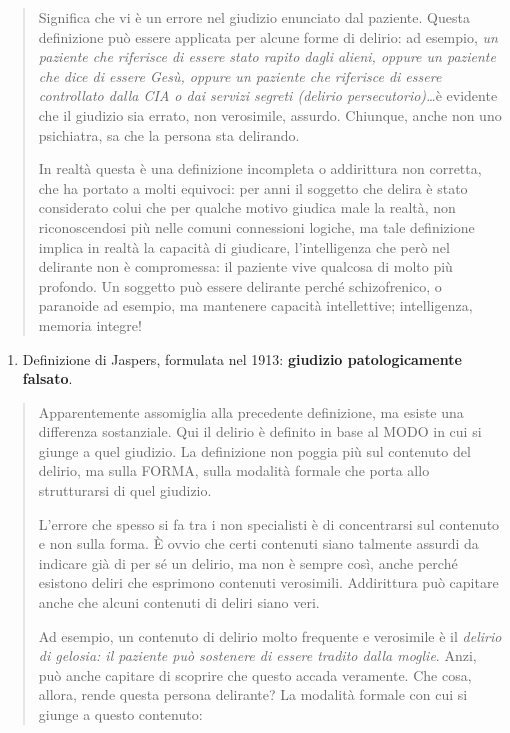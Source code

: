 \documentclass[]{article}
\begin{document}
\begin{quote}
Significa che vi è un errore nel giudizio enunciato dal paziente. Questa
definizione può essere applicata per alcune forme di delirio: ad
esempio, \emph{un paziente che riferisce di essere stato rapito dagli
alieni, oppure un paziente che dice di essere Gesù, oppure un paziente
che riferisce di essere controllato dalla CIA o dai servizi segreti
(delirio persecutorio)\ldots{}}è evidente che il giudizio sia errato,
non verosimile, assurdo. Chiunque, anche non uno psichiatra, sa che la
persona sta delirando.

In realtà questa è una definizione incompleta o addirittura non
corretta, che ha portato a molti equivoci: per anni il soggetto che
delira è stato considerato colui che per qualche motivo giudica male la
realtà, non riconoscendosi più nelle comuni connessioni logiche, ma tale
definizione implica in realtà la capacità di giudicare, l'intelligenza
che però nel delirante non è compromessa: il paziente vive qualcosa di
molto più profondo. Un soggetto può essere delirante perché
schizofrenico, o paranoide ad esempio, ma mantenere capacità
intellettive; intelligenza, memoria integre!
\end{quote}

\begin{enumerate}
\def\labelenumi{\arabic{enumi}.}
\item
  Definizione di Jaspers, formulata nel 1913: \textbf{giudizio
  patologicamente falsato}.
\end{enumerate}

\begin{quote}
Apparentemente assomiglia alla precedente definizione, ma esiste una
differenza sostanziale. Qui il delirio è definito in base al MODO in cui
si giunge a quel giudizio. La definizione non poggia più sul contenuto
del delirio, ma sulla FORMA, sulla modalità formale che porta allo
strutturarsi di quel giudizio.

L'errore che spesso si fa tra i non specialisti è di concentrarsi sul
contenuto e non sulla forma. È ovvio che certi contenuti siano talmente
assurdi da indicare già di per sé un delirio, ma non è sempre così,
anche perché esistono deliri che esprimono contenuti verosimili.
Addirittura può capitare anche che alcuni contenuti di deliri siano
veri.

Ad esempio, un contenuto di delirio molto frequente e verosimile è il
\emph{delirio di gelosia: il paziente può sostenere di essere tradito
dalla moglie}. Anzi, può anche capitare di scoprire che questo accada
veramente. Che cosa, allora, rende questa persona delirante? La modalità
formale con cui si giunge a questo contenuto:
\end{quote}
\end{document}
